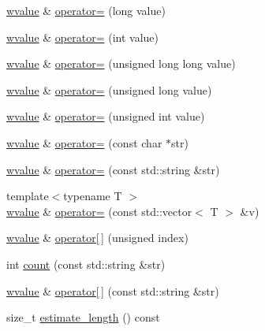 \begin{DoxyCompactItemize}
\item 
\hyperlink{classcrow_1_1json_1_1wvalue}{wvalue} \& \hyperlink{classcrow_1_1json_1_1wvalue_ae2dad9fd35a182860051ca51547d1c59}{operator=} (long value)
\item 
\hyperlink{classcrow_1_1json_1_1wvalue}{wvalue} \& \hyperlink{classcrow_1_1json_1_1wvalue_aad8380b24617a991d0afd81993c11b12}{operator=} (int value)
\item 
\hyperlink{classcrow_1_1json_1_1wvalue}{wvalue} \& \hyperlink{classcrow_1_1json_1_1wvalue_ae49edd4dc612cfb374ac7d9173066e62}{operator=} (unsigned long long value)
\item 
\hyperlink{classcrow_1_1json_1_1wvalue}{wvalue} \& \hyperlink{classcrow_1_1json_1_1wvalue_a0c2fa8d4a3d4df8b6f773710dd0cd10f}{operator=} (unsigned long value)
\item 
\hyperlink{classcrow_1_1json_1_1wvalue}{wvalue} \& \hyperlink{classcrow_1_1json_1_1wvalue_a368fededb881ece77bcb97d024ebb334}{operator=} (unsigned int value)
\item 
\hyperlink{classcrow_1_1json_1_1wvalue}{wvalue} \& \hyperlink{classcrow_1_1json_1_1wvalue_a1d3096d01b23f42b64da2d89be942ccd}{operator=} (const char $\ast$str)
\item 
\hyperlink{classcrow_1_1json_1_1wvalue}{wvalue} \& \hyperlink{classcrow_1_1json_1_1wvalue_aee7c185b7984ce7cd39567580d44dc3e}{operator=} (const std\-::string \&str)
\item 
{\footnotesize template$<$typename T $>$ }\\\hyperlink{classcrow_1_1json_1_1wvalue}{wvalue} \& \hyperlink{classcrow_1_1json_1_1wvalue_a59bab9796cae55bab5350ee8ee47676a}{operator=} (const std\-::vector$<$ T $>$ \&v)
\item 
\hyperlink{classcrow_1_1json_1_1wvalue}{wvalue} \& \hyperlink{classcrow_1_1json_1_1wvalue_ae0d1876f5cd3f8ac5b61970d12b0ad74}{operator\mbox{[}$\,$\mbox{]}} (unsigned index)
\item 
int \hyperlink{classcrow_1_1json_1_1wvalue_a1f2b15883743ea9c24709e966668da99}{count} (const std\-::string \&str)
\item 
\hyperlink{classcrow_1_1json_1_1wvalue}{wvalue} \& \hyperlink{classcrow_1_1json_1_1wvalue_a75a106571d5ae1b9be6903f8e2435754}{operator\mbox{[}$\,$\mbox{]}} (const std\-::string \&str)
\item 
size\-\_\-t \hyperlink{classcrow_1_1json_1_1wvalue_ace0ecea158ff3c13aa52a9da98c5be02}{estimate\-\_\-length} () const 
\end{DoxyCompactItemize}
